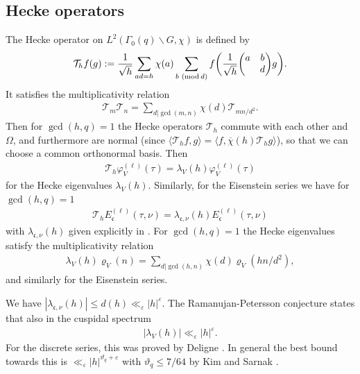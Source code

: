 \documentclass[12pt]{amsart}
\theoremstyle{definition}
\theoremstyle{remark}
\numberwithin{equation}{section}
\newcommand{\1}{{\mathbf 1}}
\newcommand{\eps}{\varepsilon}
\renewcommand{\pmod}[1]{\,\,(\mathrm{mod}\,{#1})}
\begin{document}
\subsection{Hecke operators}

The Hecke operator on $L^2(\Gamma_0(q)\backslash G,\chi)$  is defined by
\begin{align} \label{eq:heckeopdef}
    \mathcal{T}_h f(g) :=  \frac{1}{\sqrt{h}} \sum_{ad=h} \chi(a) \sum_{b  \pmod{d}} f\bigg(\frac{1}{\sqrt{h}}\mqty(a & b  \\ & d)g\bigg).
\end{align}
It satisfies the multiplicativity relation
\begin{align*}
    \mathcal{T}_m \mathcal{T}_n = \sum_{d | \gcd(m,n)} \chi(d)\mathcal{T}_{mn/d^2}. 
\end{align*}
Then for $\gcd(h,q)=1$  the Hecke operators $\mathcal{T}_h$ commute with each other and $\Omega$,  and furthermore are normal (since $\langle \mathcal{T}_h f,g \rangle = \langle  f, \overline{\chi}(h)\mathcal{T}_h g \rangle $), so that we can choose a common orthonormal basis. Then 
\begin{align}\label{eq:heckecusp}
    \mathcal{T}_h \varphi_V^{(\ell)} (\tau) = \lambda_V(h) \varphi_V^{(\ell)} (\tau)
\end{align}
for the Hecke eigenvalues $\lambda_V(h)$. Similarly, for the Eisenstein series we have for $\gcd(h,q)=1$ \cite[(6.16)]{DFIartin}
\begin{align}\label{eq:heckeeis}
    \mathcal{T}_h E_{\mathfrak{c}}^{(\ell)} (\tau,\nu) = \lambda_{\mathfrak{c},\nu}(h) E_{\mathfrak{c}}^{(\ell)} (\tau,\nu)
\end{align}
with $\lambda_{\mathfrak{c},\nu}(h) $ given explicitly in \cite[(6.17)]{DFIartin}. For $\gcd(h,q)=1$ the Hecke eigenvalues satisfy the multiplicativity relation
\begin{align*}
  \lambda_V(h) \varrho_V(n) = \sum_{d | \gcd(h,n)} \chi(d) \varrho_V(hn/d^2),  
\end{align*}
and similarly for the Eisenstein series.

We have  $|\lambda_{\mathfrak{c},\nu}(h)| \leq d(h)  \ll_\eps |h|^{\eps}.$ The Ramanujan-Petersson conjecture states that also in the cuspidal spectrum
\begin{align*}
 |\lambda_{V}(h)| \ll_\eps |h|^{\eps}.
\end{align*}
For the discrete series, this was proved by Deligne \cite{Deligne1968-1969}. In general the best bound towards this is $ \ll_\eps |h|^{\vartheta_{q}+\eps}$ with $\vartheta_q \leq 7/64$ by Kim and Sarnak \cite{KimSarnak}. 
 
\end{document}
